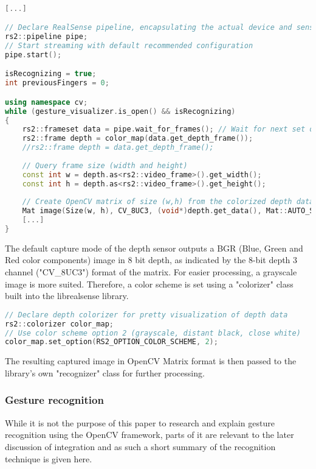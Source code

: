 \documentclass[BSA,Bachelor,english]{twbook}%
\begin{document}
\begin{lstlisting}[language=C++,name={RealSense image capture and conversion},label={rs:loop:1}]

[...]

// Declare RealSense pipeline, encapsulating the actual device and sensors
rs2::pipeline pipe;
// Start streaming with default recommended configuration
pipe.start();

isRecognizing = true;
int previousFingers = 0;

using namespace cv;
while (gesture_visualizer.is_open() && isRecognizing)
{
	rs2::frameset data = pipe.wait_for_frames(); // Wait for next set of frames from the camera
	rs2::frame depth = color_map(data.get_depth_frame());
	//rs2::frame depth = data.get_depth_frame();
	
	// Query frame size (width and height)
	const int w = depth.as<rs2::video_frame>().get_width();
	const int h = depth.as<rs2::video_frame>().get_height();
	
	// Create OpenCV matrix of size (w,h) from the colorized depth data
	Mat image(Size(w, h), CV_8UC3, (void*)depth.get_data(), Mat::AUTO_STEP);
	[...]    
}
\end{lstlisting}

The default capture mode of the depth sensor outputs a BGR (Blue, Green and Red color components) image in 8 bit depth, as indicated by the 8-bit depth 3 channel ("CV\_8UC3") format of the matrix. For easier processing, a grayscale image is more suited. Therefore, a color scheme is set using a "colorizer" class built into the librealsense library.

\begin{lstlisting}[language=C++,name={RealSense image colorizer},label={rs:init:1}]
// Declare depth colorizer for pretty visualization of depth data
rs2::colorizer color_map;
// Use color scheme option 2 (grayscale, distant black, close white)
color_map.set_option(RS2_OPTION_COLOR_SCHEME, 2);
\end{lstlisting}

The resulting captured image in OpenCV Matrix format is then passed to the library's own "recognizer" class for further processing.

\subsubsection{Gesture recognition}

While it is not the purpose of this paper to research and explain gesture recognition using the OpenCV framework, parts of it are relevant to the later discussion of integration and as such a short summary of the recognition technique is given here.
\end{document}

